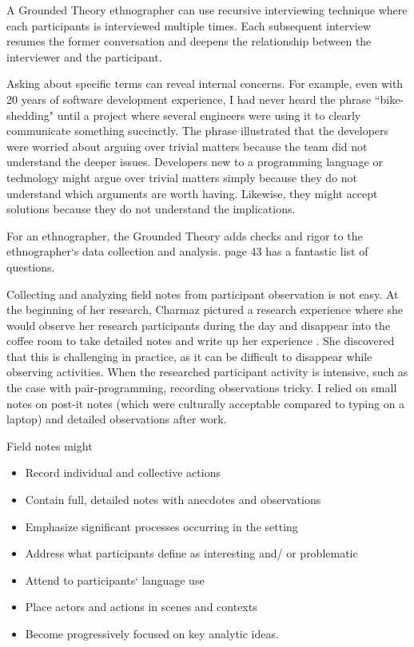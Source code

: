 A Grounded Theory ethnographer can use recursive interviewing technique where each participants is interviewed multiple times. Each subsequent interview resumes the former conversation and deepens the relationship between the interviewer and the participant. 

Asking about specific terms can reveal internal concerns. For example, even with 20 years of software development experience, I had never heard the phrase ``bike-shedding" until a project where several engineers were using it to clearly communicate something succinctly. The phrase  illustrated that the developers were worried about arguing over trivial matters because the team did not understand the deeper issues. Developers new to a programming language or technology might argue over trivial matters simply because they do not understand which arguments are worth having. Likewise, they might accept solutions because they do not understand the implications.

For an ethnographer, the  Grounded Theory adds checks and rigor to the ethnographer`s data collection and analysis. page 43 has a fantastic list of questions.

Collecting and analyzing field notes from participant observation is not easy. At the beginning of her research, Charmaz pictured a research experience where she would observe her research participants during the day and disappear into the coffee room to take detailed notes and write up her experience \cite{Charmaz}. She discovered that this is challenging in practice, as it can be difficult to disappear while observing activities. When the researched participant activity is intensive, such as the case with pair-programming, recording observations tricky. I relied on small notes on post-it notes (which were culturally acceptable compared to typing on a laptop) and detailed observations after work.

Field notes might
\begin{itemize}
\item Record individual and collective actions 
\item Contain full, detailed notes with anecdotes and observations 
\item Emphasize significant processes occurring in the setting 
\item Address what participants define as interesting and/ or problematic 
\item Attend to participants` language use 
\item Place actors and actions in scenes and contexts 
\item Become progressively focused on key analytic ideas.
\end{itemize}

